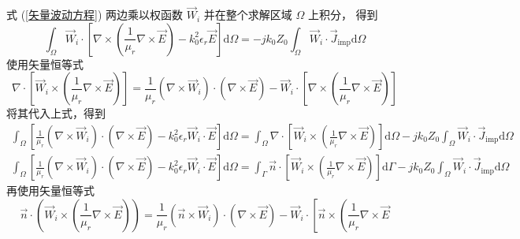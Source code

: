 \begin{solution}
    式 (\ref{矢量波动方程}) 两边乘以权函数 $\vec{W}_i$ 并在整个求解区域 $\Omega$ 上积分，
    得到
    \begin{equation*}
        \int_{\Omega}\vec{W}_i\cdot\left[
            \nabla\times\left(
                \frac{1}{\mu_r}\nabla\times\vec{E}
            \right)-k_0^2\epsilon_r\vec{E}
        \right]\text{d}\Omega
        =-jk_0Z_0
        \int_{\Omega}\vec{W}_i\cdot \vec{J}_{\text{imp}}\text{d}\Omega
    \end{equation*}
    使用矢量恒等式
    \begin{equation*}
        \nabla\cdot\left[
            \vec{W}_i\times\left(
                \frac{1}{\mu_r}\nabla\times\vec{E}
            \right)
        \right]
        =\frac{1}{\mu_r}
        (\nabla\times\vec{W}_i)\cdot(\nabla\times\vec{E})
        -\vec{W}_i\cdot\left[
            \nabla\times\left(
            \frac{1}{\mu_r}\nabla\times\vec{E}
        \right)
        \right]
    \end{equation*}
    将其代入上式，得到
    \begin{gather*}
        \int_{\Omega}\left[
            \frac{1}{\mu_r}
            (\nabla\times\vec{W}_i)\cdot(\nabla\times\vec{E})
            -k_0^2\epsilon_r\vec{W}_i\cdot\vec{E}
        \right]\text{d}\Omega
        =\int_{\Omega}\nabla\cdot\left[
            \vec{W}_i\times\left(
                \frac{1}{\mu_r}\nabla\times\vec{E}
            \right)
        \right]\text{d}\Omega
        -jk_0Z_0\int_{\Omega}\vec{W}_i\cdot\vec{J}_{\text{imp}}\text{d}\Omega\\
        \int_{\Omega}\left[
            \frac{1}{\mu_r}
            (\nabla\times\vec{W}_i)\cdot(\nabla\times\vec{E})
            -k_0^2\epsilon_r\vec{W}_i\cdot\vec{E}
        \right]\text{d}\Omega
        =\int_{\Gamma}
            \vec{n}\cdot\left[
                \vec{W}_i\times\left(
                \frac{1}{\mu_r}\nabla\times\vec{E}
            \right)
            \right]
        \text{d}\Gamma
        -jk_0Z_0\int_{\Omega}\vec{W}_i\cdot\vec{J}_{\text{imp}}\text{d}\Omega
    \end{gather*}
    再使用矢量恒等式
    \begin{equation*}
        \vec{n}\cdot\left(
            \vec{W}_i\times\left(
                \frac{1}{\mu_r}\nabla\times\vec{E}
            \right)
        \right)
        =\frac{1}{\mu_r}
        (\vec{n}\times\vec{W}_i)\cdot(\nabla\times\vec{E})
        -\vec{W}_i\cdot\left[
            \vec{n}\times\left(
            \frac{1}{\mu_r}\nabla\times\vec{E}

\end{equation*}
\end{solution}
